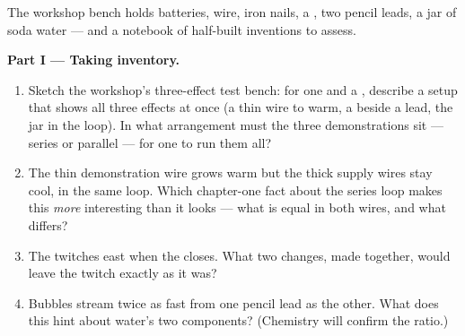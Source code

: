 \begin{problem}\label{pb:g8:electric-current-effects:1}
The workshop bench holds batteries, wire, iron nails, a
, two pencil leads, a jar of soda water --- and a
notebook of half-built inventions to assess.

\medskip\noindent\textbf{Part I --- Taking inventory.}
\begin{enumerate}
  \item Sketch the workshop's three-effect test bench: for one
         and a , describe a setup that shows all
        three effects at once (a thin wire to warm, a 
        beside a lead, the jar in the loop). In what
        arrangement must the three demonstrations sit ---
        series or parallel --- for one  to run them all?
  \item The thin demonstration wire grows warm but the thick
        supply wires stay cool, in the same loop. Which
        chapter-one fact about the series loop makes this
        \emph{more} interesting than it looks --- what is equal
        in both wires, and what differs?
  \item The  twitches east when the  closes. What
        two changes, made together, would leave the twitch
        exactly as it was?
  \item Bubbles stream twice as fast from one pencil lead as
        the other. What does this hint about water's two
        components? (Chemistry will confirm the ratio.)
\end{enumerate}


\end{problem}

